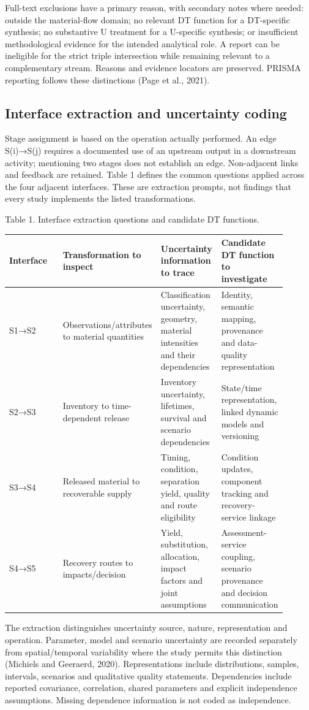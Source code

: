 Full-text exclusions have a primary reason, with secondary notes where needed: outside the material-flow domain; no relevant DT function for a DT-specific synthesis; no substantive U treatment for a U-specific synthesis; or insufficient methodological evidence for the intended analytical role. A report can be ineligible for the strict triple intersection while remaining relevant to a complementary stream. Reasons and evidence locators are preserved. PRISMA reporting follows these distinctions (Page et al., 2021).


\subsection{Interface extraction and uncertainty coding}
Stage assignment is based on the operation actually performed. An edge S(i)→S(j) requires a documented use of an upstream output in a downstream activity; mentioning two stages does not establish an edge. Non-adjacent links and feedback are retained. Table 1 defines the common questions applied across the four adjacent interfaces. These are extraction prompts, not findings that every study implements the listed transformations.

Table 1. Interface extraction questions and candidate DT functions.

\begin{longtable}{p{0.225\linewidth}p{0.225\linewidth}p{0.225\linewidth}p{0.225\linewidth}}
\toprule
Interface & Transformation to inspect & Uncertainty information to trace & Candidate DT function to investigate\\
\midrule
S1→S2 & Observations/attributes to material quantities & Classification uncertainty, geometry, material intensities and their dependencies & Identity, semantic mapping, provenance and data-quality representation\\
S2→S3 & Inventory to time-dependent release & Inventory uncertainty, lifetimes, survival and scenario dependencies & State/time representation, linked dynamic models and versioning\\
S3→S4 & Released material to recoverable supply & Timing, condition, separation yield, quality and route eligibility & Condition updates, component tracking and recovery-service linkage\\
S4→S5 & Recovery routes to impacts/decision & Yield, substitution, allocation, impact factors and joint assumptions & Assessment-service coupling, scenario provenance and decision communication\\
\bottomrule
\end{longtable}
The extraction distinguishes uncertainty source, nature, representation and operation. Parameter, model and scenario uncertainty are recorded separately from spatial/temporal variability where the study permits this distinction (Michiels and Geeraerd, 2020). Representations include distributions, samples, intervals, scenarios and qualitative quality statements. Dependencies include reported covariance, correlation, shared parameters and explicit independence assumptions. Missing dependence information is not coded as independence.


